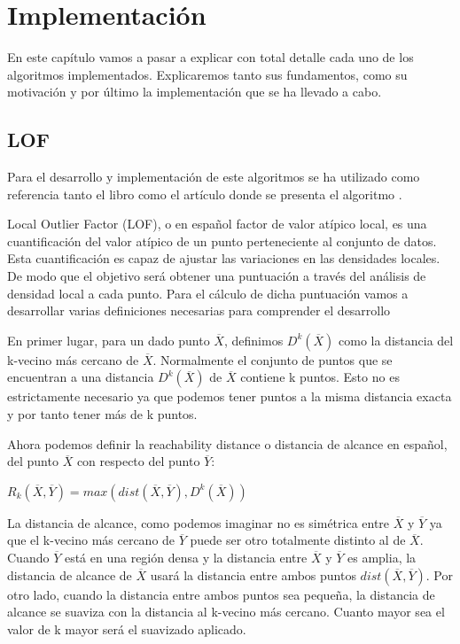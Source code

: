 \chapter{Implementación}
En este capítulo vamos a pasar a explicar con 
total detalle cada uno de los algoritmos implementados.
Explicaremos tanto sus fundamentos, como su motivación
y por último la implementación que se ha llevado a cabo.

\section{LOF}
Para el desarrollo y implementación de este algoritmos se 
ha utilizado como referencia tanto el libro \cite{aggarwalOutlierAnalysis2017}
como el artículo donde se presenta el algoritmo \cite{breunigLOFIdentifyingDensitybased2000}.


Local Outlier Factor (LOF), o en español factor de 
valor atípico local, es una cuantificación 
del valor atípico de un punto perteneciente al conjunto de datos.
Esta cuantificación es capaz de ajustar las variaciones
en las densidades locales. De modo que el objetivo será obtener 
una puntuación a través del análisis de densidad local a cada punto.
Para el cálculo de dicha puntuación vamos a desarrollar varias 
definiciones necesarias para comprender el desarrollo


En primer lugar, para un dado punto $\overline{X}$,
definimos $D^k(\overline{X})$ como la distancia del 
k-vecino más cercano de $\overline{X}$. Normalmente
el conjunto de puntos que se encuentran a una distancia
$D^k(\overline{X})$ de  $\overline{X}$ contiene k puntos.
Esto no es estrictamente necesario ya que podemos tener puntos
a la misma distancia exacta y por tanto tener más de k
puntos.


Ahora podemos definir la reachability distance o distancia de
alcance en español, del punto  $\overline{X}$ con respecto
del punto  $\overline{Y}$: 

\begin{center}
    $R_k(\overline{X},\overline{Y}) = max ( dist(\overline{X},\overline{Y}), D^k(\overline{X}) ) $
\end{center}

La distancia de alcance, como podemos imaginar no es simétrica
entre $\overline{X}$ y $\overline{Y}$ ya que el k-vecino más cercano
de  $\overline{Y}$ puede ser otro totalmente distinto al de 
$\overline{X}$. Cuando $\overline{Y}$ está en una región densa y la
distancia entre $\overline{X}$ y $\overline{Y}$ es amplia, la distancia
de alcance de $\overline{X}$ usará la distancia entre ambos puntos $dist(\overline{X},\overline{Y})$. 
Por otro lado, cuando la distancia entre ambos puntos sea pequeña, la distancia de
alcance se suaviza con la distancia al k-vecino más cercano. Cuanto mayor
sea el valor de k mayor será el suavizado aplicado.


